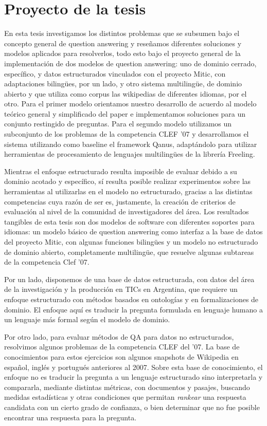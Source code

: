\section{Proyecto de la tesis}
\label{sec:proyecto}

En esta tesis investigamos los distintos problemas que se subsumen bajo el concepto general de question answering y reseñamos diferentes soluciones y modelos aplicados para resolverlos, todo esto bajo el proyecto general de la implementación de dos modelos de question answering: uno de dominio cerrado, específico, y datos estructurados vinculados con el proyecto Mitic, con adaptaciones bilingües, por un lado, y otro sistema multilingüe, de dominio abierto y que utiliza como corpus las wikipedias de diferentes idiomas, por el otro. Para el primer modelo orientamos nuestro desarrollo de acuerdo al modelo teórico general y simplificado del paper \cite{QADB1} e implementamos soluciones para un conjunto restingido de preguntas. Para el segundo modelo utilizamos   un subconjunto de los problemas de la competencia CLEF '07 y desarrollamos el sistema utilizando como baseline el framework Qanus, adaptándolo para utilizar herramientas de procesamiento de lenguajes multilingües de la librería Freeling.

Mientras el enfoque estructurado resulta imposible de evaluar debido a su dominio acotado y específico, sí resulta posible realizar experimentos sobre las herramientas al utilizarlas en el modelo no estructurado, gracias a las distintas competencias cuya razón de ser es, justamente, la creación de criterios de evaluación al nivel de la comunidad de investigadores del área. Los resultados tangibles de esta tesis son dos modelos de software con diferentes soportes para idiomas: un modelo básico de question answering como interfaz a la base de datos del proyecto Mitic, con algunas funciones bilingües y un modelo no estructurado de dominio abierto, completamente multilingüe, que resuelve algunas subtareas de la competencia Clef '07.


Por un lado, disponemos de una base de datos estructurada, con datos del área de la investigación y la
producción en TICs en Argentina, que requiere un enfoque estructurado con métodos basados en ontologías y en
formalizaciones de dominio. El enfoque aquí es traducir la pregunta formulada en lenguaje humano a un lenguaje más
formal  según el modelo de dominio.

Por otro lado, para evaluar métodos de QA para datos no estructurados, resolvimos algunos problemas de la competencia CLEF del '07. La base de conocimientos para
estos ejercicios son algunos snapshots de Wikipedia en español, inglés y portugués anteriores al 2007. Sobre esta base de conocimiento,
el enfoque no es traducir la pregunta a un lenguaje estructurado sino interpretarla y compararla, mediante distintas métricas,
con documentos y pasajes, buscando medidas estadísticas y otras condiciones que permitan \textit{rankear} una respuesta candidata
con un cierto grado de confianza, o bien determinar que no fue posible encontrar una respuesta para la pregunta.


